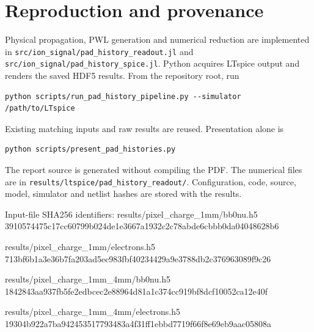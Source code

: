\documentclass[11pt,a4paper]{article}
\begin{document}
\section{Reproduction and provenance}
Physical propagation, PWL generation and numerical reduction are implemented in
\texttt{src/ion\_signal/pad\_history\_readout.jl} and
\texttt{src/ion\_signal/pad\_history\_spice.jl}. Python acquires LTspice output and
renders the saved HDF5 results. From the repository root, run
\begin{verbatim}
python scripts/run_pad_history_pipeline.py --simulator /path/to/LTspice
\end{verbatim}
Existing matching inputs and raw results are reused. Presentation alone is
\begin{verbatim}
python scripts/present_pad_histories.py
\end{verbatim}
The report source is generated without compiling the PDF. The numerical files
are in \texttt{results/ltspice/pad\_history\_readout/}. Configuration, code, source,
model, simulator and netlist hashes are stored with the results.

Input-file SHA256 identifiers:
\small
\noindent results/pixel\_charge\_1mm/bb0nu.h5\\{\ttfamily\scriptsize 3910574475c17cc60799b024de1e3667a1932c2c78abde6cbbb0da04048628b6}\par
\noindent results/pixel\_charge\_1mm/electrons.h5\\{\ttfamily\scriptsize 713bf6b1a3e36b7fa203ad5ec983fbf40234429a9e3788db2c376963089f9c26}\par
\noindent results/pixel\_charge\_1mm\_4mm/bb0nu.h5\\{\ttfamily\scriptsize 1842843aa937fb5fe2edbcec2e88964d81a1c374cc919bf8dcf10052ca12e40f}\par
\noindent results/pixel\_charge\_1mm\_4mm/electrons.h5\\{\ttfamily\scriptsize 19304b922a7ba942453517793483a4f31ff1ebbd7719f66f8e69eb9aac05808a}\par
\end{document}
